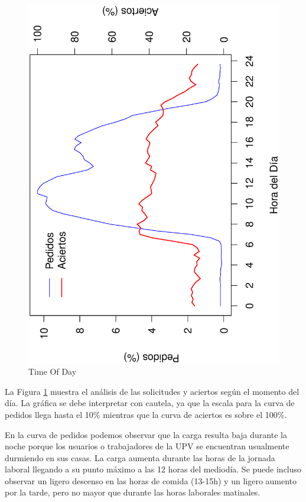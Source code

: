 \documentclass[twocolumn,twoside]{Jornadas}
\begin{document}
\begin{figure}[ht!]
\begin{center}
  \includegraphics[scale=0.30,angle=-90]{figures/TimeOfDay3_full.eps}
\end{center}
\caption{Time Of Day} \label{Timeday}
\end{figure}

La Figura \ref{Timeday} muestra el análisis de las solicitudes y aciertos según el momento del día. La gráfica se debe interpretar con cautela, ya que la escala para la curva de pedidos llega hasta el 10\% mientras que la curva de aciertos es sobre el 100\%. 

En la curva de pedidos podemos observar que la carga resulta baja durante la noche porque los usuarios o trabajadores de la UPV se encuentran usualmente durmiendo en sus casas. La carga aumenta durante las horas de la jornada laboral llegando a su punto máximo a las 12 horas del mediodía. Se puede incluso observar un ligero descenso en las horas de comida (13-15h) y un ligero aumento por la tarde, pero no mayor que durante las horas laborales matinales.
\end{document}
